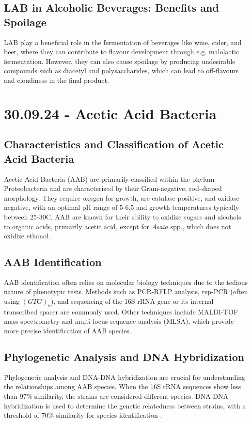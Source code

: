 \subsection{LAB in Alcoholic Beverages: Benefits and Spoilage}
LAB play a beneficial role in the fermentation of beverages like wine, cider, and beer, where they can contribute to flavour development through e.g. malolactic fermentation. However, they can also cause spoilage by producing undesirable compounds such as diacetyl and polysaccharides, which can lead to off-flavours and cloudiness in the final product.

\section{30.09.24 - Acetic Acid Bacteria}
\subsection{Characteristics and Classification of Acetic Acid Bacteria} 
Acetic Acid Bacteria (AAB) are primarily classified within the phylum Proteobacteria and are characterized by their Gram-negative, rod-shaped morphology. They require oxygen for growth, are catalase positive, and oxidase negative, with an optimal pH range of 5-6.5 and growth temperatures typically between 25-30\textdegree C. AAB are known for their ability to oxidize sugars and alcohols to organic acids, primarily acetic acid, except for \textit{Asaia} spp., which does not oxidize ethanol.

\subsection{AAB Identification} 
AAB identification often relies on molecular biology techniques due to the tedious nature of phenotypic tests. Methods such as PCR-RFLP analysis, rep-PCR (often using $(GTG)_5$), and sequencing of the 16S rRNA gene or its internal transcribed spacer are commonly used. Other techniques include MALDI-TOF mass spectrometry and multi-locus sequence analysis (MLSA), which provide more precise identification of AAB species.

\subsection{Phylogenetic Analysis and DNA Hybridization} 
Phylogenetic analysis and DNA-DNA hybridization are crucial for understanding the relationships among AAB species. When the 16S rRNA sequences show less than 97\% similarity, the strains are considered different species. DNA-DNA hybridization is used to determine the genetic relatedness between strains, with a threshold of 70\% similarity for species identification \cite*{L10-PropMin}.

